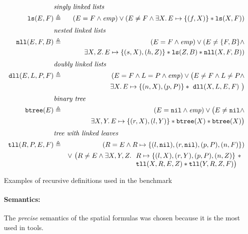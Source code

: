 \documentclass[twoside,11pt]{article}
\newcommand{\sep}{.\,}
\newcommand{\posep}{*}
\newcommand{\points}{\mapsto}
\newcommand{\nil}{\mathtt{nil}}
\newcommand{\ls}{\mathtt{ls}}
\newcommand{\dll}{\mathtt{dll}}
\newcommand{\nll}{\mathtt{nll}}
\begin{document}
\begin{table}
\begin{eqnarray}
%
\lefteqn{\textit{singly linked lists}} \nonumber \\
\ls(E,F) & \triangleq & (E=F\land\mathit{emp}) \lor (E\neq F \land 
\exists X\sep E\points\{(f,X)\}\posep \ls(X,F)) 
\\[1mm]
%  
\lefteqn{\textit{nested linked lists}} \nonumber \\ 
\nll(E,F,B) & \triangleq & (E=F\land\mathit{emp}) \lor (E\neq \{F,B\} \land \\
&& \exists X,Z\sep E\points\{(s,X),(h,Z)\}\posep \ls(Z,B) \posep\nll(X,F,B)) \nonumber
\\[1mm]
%  
\lefteqn{\textit{doubly linked lists}} \nonumber \\ 
\dll(E, L, P, F) & \triangleq & (E=F\land L=P\land \mathit{emp}) \lor \big( E\neq F \land L\neq P \land \\
&& \exists X\sep E\points \{(n,X),(p,P)\} \posep\ \dll(X,L,E,F)\ \big)\nonumber
\\[1mm]
%  
\lefteqn{\textit{binary tree}} \nonumber \\ 
\mathtt{btree}(E) & \triangleq & (E=\nil\land \mathit{emp}) \lor \big( E\neq \nil \land 
\\
&& \exists X,Y\sep E\points \{(r,X),(l,Y)\} \posep \mathtt{btree}(X) \posep \mathtt{btree}(X)\big)
\nonumber 
\\[1mm]
%  
\lefteqn{\textit{tree with linked leaves}} \nonumber \\ 
\mathtt{tll}(R,P,E,F) & \triangleq & (R=E \land R\points \{(l,\nil),(r,\nil),(p,P),(n,F)\}) \\
&& \lor~\big( R\neq E \land \exists X,Y,Z\sep 
\begin{array}[t]{l}
R\points \{(l,X),(r,Y),(p,P),(n,Z)\} \ \posep \\
\mathtt{tll}(X,R,E,Z) \posep \mathtt{tll}(Y,R,Z,F)\big)
\end{array} \nonumber  
\end{eqnarray}

\caption{Examples of recursive definitions used in the benchmark}
\label{tab:RD}

\end{table}

\paragraph{Semantics:}
The \emph{precise} semantics of the spatial formulas was chosen because it is the most used in tools.
\end{document}
